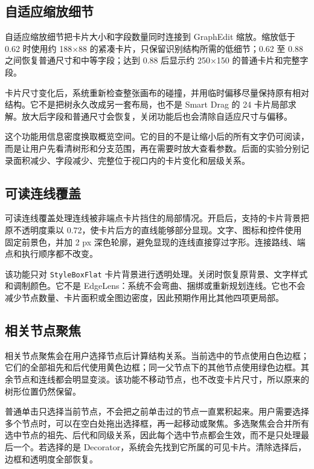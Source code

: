 \documentclass[11pt,a4paper,oneside,extrafontsizes]{memoir}
\begin{document}
\subsection{自适应缩放细节}

自适应缩放细节把卡片大小和字段数量同时连接到 GraphEdit 缩放。缩放低于 0.62 时使用约 188×88 的紧凑卡片，只保留识别结构所需的低细节；0.62 至 0.88 之间恢复普通尺寸和中等字段；达到 0.88 后显示约 250×150 的普通卡片和完整字段。

卡片尺寸变化后，系统重新检查整张画布的碰撞，并用临时偏移尽量保持原有相对结构。它不是把树永久改成另一套布局，也不是 Smart Drag 的 24 卡片局部求解。放大后字段和普通尺寸会恢复，关闭功能后也会清除自适应尺寸与偏移。

这个功能用信息密度换取概览空间。它的目的不是让缩小后的所有文字仍可阅读，而是让用户先看清树形和分支范围，再在需要时放大查看参数。后面的实验分别记录面积减少、字段减少、完整位于视口内的卡片变化和层级关系。

\subsection{可读连线覆盖}

可读连线覆盖处理连线被非端点卡片挡住的局部情况。开启后，支持的卡片背景把原不透明度乘以 0.72，使卡片后方的直线能够部分显现。文字、图标和控件使用固定前景色，并加 2 px 深色轮廓，避免显现的连线直接穿过字形。连接路线、端点和执行顺序都不改变。

该功能只对 \texttt{StyleBoxFlat} 卡片背景进行透明处理。关闭时恢复原背景、文字样式和调制颜色。它不是 EdgeLens：系统不会弯曲、捆绑或重新规划连线。它也不会减少节点数量、卡片面积或全图边密度，因此预期作用比其他四项更局部。

\subsection{相关节点聚焦}

相关节点聚焦会在用户选择节点后计算结构关系。当前选中的节点使用白色边框；它们的全部祖先和后代使用黄色边框；同一父节点下的其他节点使用绿色边框。其余节点和连线都会明显变淡。该功能不移动节点，也不改变卡片尺寸，所以原来的树形位置仍然保留。

普通单击只选择当前节点，不会把之前单击过的节点一直累积起来。用户需要选择多个节点时，可以在空白处拖出选择框，再一起移动或聚焦。多选聚焦会合并所有选中节点的祖先、后代和同级关系，因此每个选中节点都会生效，而不是只处理最后一个。若选择的是 Decorator，系统会先找到它所属的可见卡片。清除选择后，边框和透明度全部恢复。
\end{document}
